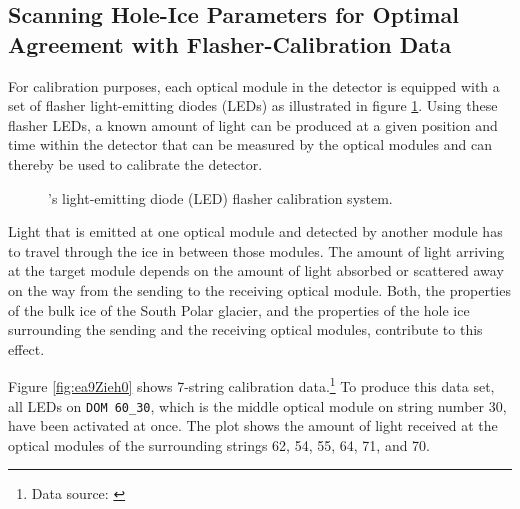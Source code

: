 
\subsection{Scanning Hole-Ice Parameters for Optimal Agreement with Flasher-Calibration Data}
\label{sec:flasher}


For calibration purposes, each optical module in the \icecube detector is equipped with a set of flasher light-emitting diodes (LEDs) as illustrated in figure \ref{fig:Quee3yui}. Using these flasher LEDs, a known amount of light can be produced at a given position and time within the detector that can be measured by the optical modules and can thereby be used to calibrate the detector. \cite{icepaper}

\begin{figure}[htbp]
  \hfill
  \caption{\icecube's light-emitting diode (LED) flasher calibration system.}
  \label{fig:Quee3yui}
\end{figure}

Light that is emitted at one optical module and detected by another module has to travel through the ice in between those modules. The amount of light arriving at the target module depends on the amount of light absorbed or scattered away on the way from the sending to the receiving optical module. Both, the properties of the bulk ice of the South Polar glacier, and the properties of the hole ice surrounding the sending and the receiving optical modules, contribute to this effect.

Figure \ref{fig:ea9Zieh0} shows 7-string calibration data.\footnote{Data source: \cite{flasherdata}} To produce this data set, all LEDs on \texttt{DOM 60\_30}, which is the middle optical module on string number 30, have been activated at once. The plot shows the amount of light received at the optical modules of the surrounding strings 62, 54, 55, 64, 71, and 70.

